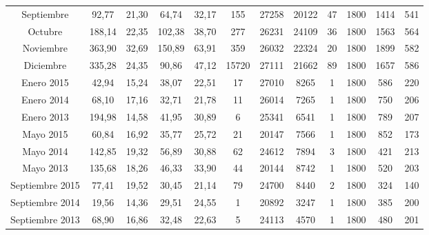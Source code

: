 \begin{landscape}
\begin{table}[ht!]
{\begin{tabular}{|c|c|c|c|c|c|c|c|c|c|c|c|}
        Septiembre      & 92,77     & 21,30     & 64,74   & 32,17 & 155     & 27258 & 20122 & 47   & 1800  & 1414  & 541 \\
        Octubre         & 188,14    & 22,35     & 102,38  & 38,70 & 277     & 26231 & 24109 & 36   & 1800  & 1563  & 564 \\
        Noviembre       & 363,90    & 32,69     & 150,89  & 63,91 & 359     & 26032 & 22324 & 20   & 1800  & 1899  & 582 \\
        Diciembre       & 335,28    & 24,35     & 90,86   & 47,12 & 15720   & 27111 & 21662 & 89   & 1800  & 1657  & 586 \\
        \hline 
        Enero 2015      & 42,94     & 15,24     & 38,07   & 22,51 & 17      & 27010  & 8265  & 1   & 1800   & 586  & 220 \\
        Enero 2014      & 68,10     & 17,16     & 32,71   & 21,78 & 11      & 26014  & 7265  & 1   & 1800   & 750  & 206 \\
        Enero 2013      & 194,98    & 14,58     & 41,95   & 30,89 & 6       & 25341  & 6541  & 1   & 1800   & 789  & 207 \\
        Mayo 2015       & 60,84     & 16,92     & 35,77   & 25,72 & 21      & 20147  & 7566  & 1   & 1800   & 852  & 173 \\
        Mayo 2014       & 142,85    & 19,32     & 56,89   & 30,88 & 62      & 24612  & 7894  & 3   & 1800   & 421  & 213 \\
        Mayo 2013       & 135,68    & 18,26     & 46,33   & 33,90 & 44      & 20144  & 8742  & 1   & 1800   & 520  & 203 \\
        Septiembre 2015 & 77,41     & 19,52     & 30,45   & 21,14 & 79      & 24700  & 8440  & 2   & 1800   & 324  & 140 \\
        Septiembre 2014 & 19,56     & 14,36     & 29,51   & 24,55 & 1       & 20892  & 3247  & 1   & 1800   & 385  & 200 \\
        Septiembre 2013 & 68,90     & 16,86     & 32,48   & 22,63 & 5       & 24113  & 4570  & 1   & 1800   & 480  & 201 \\
        \hline  
    \end{tabular}
    }   
\end{table}
\end{landscape}

